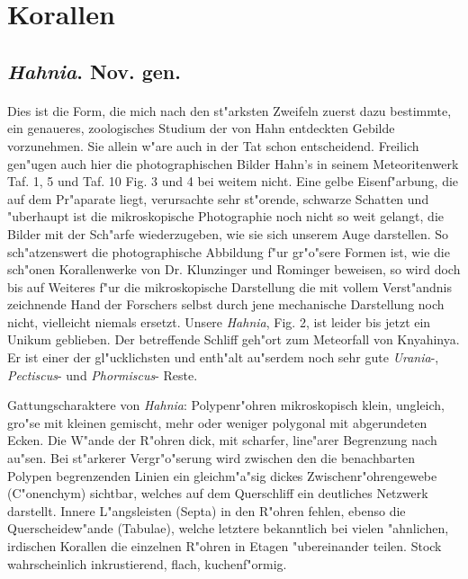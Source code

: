 \documentclass[a4paper, 11pt, oneside]{article}
\begin{document}
\section{Korallen}
\subsection{\emph{Hahnia}. Nov. gen.}
\paragraph{}
Dies ist die Form, die mich nach den st"arksten Zweifeln zuerst dazu bestimmte, ein genaueres, zoologisches Studium der von Hahn entdeckten Gebilde vorzunehmen. Sie allein w"are auch in der Tat schon entscheidend. Freilich gen"ugen auch hier die photographischen Bilder Hahn's in seinem Meteoritenwerk Taf. 1, 5 und Taf. 10 Fig. 3 und 4 bei weitem nicht. Eine gelbe Eisenf"arbung, die auf dem Pr"aparate liegt, verursachte sehr st"orende, schwarze Schatten und "uberhaupt ist die mikroskopische Photographie noch nicht so weit gelangt, die Bilder mit der Sch"arfe wiederzugeben, wie sie sich unserem Auge darstellen. So sch"atzenswert die photographische Abbildung f"ur gr"o"sere Formen ist, wie die sch"onen Korallenwerke von Dr. Klunzinger und Rominger beweisen, so wird doch bis auf Weiteres f"ur die mikroskopische Darstellung die mit vollem Verst"andnis zeichnende Hand der Forschers selbst durch jene mechanische Darstellung noch nicht, vielleicht niemals ersetzt. Unsere \emph{Hahnia}, Fig. 2, ist leider bis jetzt ein Unikum geblieben. Der betreffende Schliff geh"ort zum Meteorfall von Knyahinya. Er ist einer der gl"ucklichsten und enth"alt au"serdem noch sehr gute \emph{Urania}-, \emph{Pectiscus}- und \emph{Phormiscus}- Reste.

Gattungscharaktere von \emph{Hahnia}: Polypenr"ohren mikroskopisch klein, ungleich, gro"se mit kleinen gemischt, mehr oder weniger polygonal mit abgerundeten Ecken. Die W"ande der R"ohren dick, mit scharfer, line"arer Begrenzung nach au"sen. Bei st"arkerer Vergr"o"serung wird zwischen den die benachbarten Polypen begrenzenden Linien ein gleichm"a"sig dickes Zwischenr"ohrengewebe (C"onenchym) sichtbar, welches auf dem Querschliff ein deutliches Netzwerk darstellt. Innere L"angsleisten (Septa) in den R"ohren fehlen, ebenso die Querscheidew"ande (Tabulae), welche letztere bekanntlich bei vielen "ahnlichen, irdischen Korallen die einzelnen R"ohren in Etagen "ubereinander teilen. Stock wahrscheinlich inkrustierend, flach, kuchenf"ormig.
\end{document}
